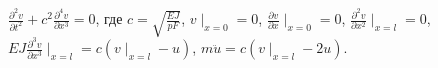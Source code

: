 $\frac{\partial ^2v}{\partial t^2} +
c^2 \frac{\partial ^4v}{\partial x^3} = 0$,
где $c = \sqrt{\frac{EJ}{pF}}$, $v \mid _{x=0} = 0$,
$\frac{\partial v}{\partial x}\mid _{x=0} = 0$,
$\frac{\partial ^2v}{\partial x^2}\mid _{x = l} = 0$,
$EJ\frac{\partial ^3v}{\partial x^3}\mid _{x = l} =
c(v \mid _{x = l} - u)$,
$m\ddot{u} = c(v\mid _{x=l} - 2u)$.
